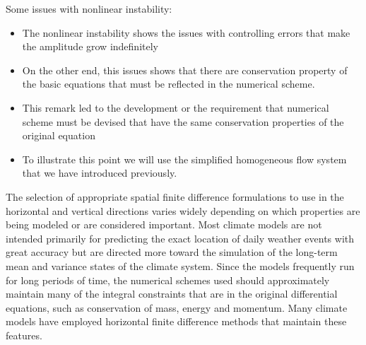 Some issues with nonlinear instability:
\begin{itemize}
    \item The nonlinear instability shows the issues with controlling errors that make the amplitude grow indefinitely
    \item On the other end, this issues shows that there are conservation property of the basic equations that must be reflected in the numerical scheme.
    \item This remark led to the development or the requirement that numerical scheme must be devised that have the same conservation properties of the original equation
    \item To illustrate this point we will use the simplified homogeneous flow system that we have introduced previously.
\end{itemize}
The selection of appropriate spatial finite difference formulations to use in the horizontal and vertical directions varies widely depending on which properties are being modeled or are considered important. Most climate models are not intended primarily for predicting the exact location of daily weather events with great accuracy but are directed more toward the simulation of the long-term mean and variance states of the climate system. Since the models frequently run for long periods of time, the numerical schemes used should approximately maintain many of the integral constraints that are in the original differential equations, such as conservation of mass, energy and momentum. Many climate models have employed horizontal finite difference methods that maintain these features. 

